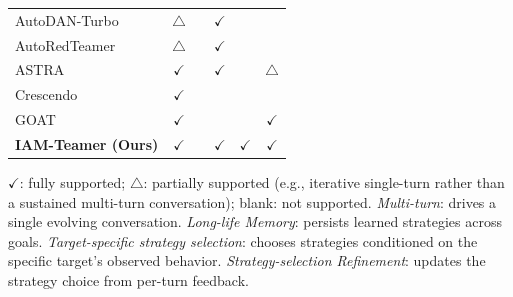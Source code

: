 \begin{table}[htbp]
\begin{tabular}{lccccc}
            AutoDAN-Turbo~\cite{autodanturbo}                                & $\triangle$        &                                      & $\checkmark$              &                                              &                                          \\
            AutoRedTeamer~\cite{autoredteamer}            & $\triangle$        &                                      & $\checkmark$              &                                              &                                          \\
            ASTRA~\cite{astra}                                               & $\checkmark$       &                                      & $\checkmark$              &                                              & $\triangle$                              \\
            Crescendo~\cite{crescendo}                    & $\checkmark$       &                                      &                           &                                              &                                          \\
            GOAT~\cite{goat}                                                 & $\checkmark$       &                                      &                           &                                              & $\checkmark$                             \\
            \midrule
            \textbf{IAM-Teamer (Ours)}                    & $\checkmark$       &                                      & $\checkmark$              & $\checkmark$                                 & $\checkmark$                             \\
            \bottomrule
      \end{tabular}

      \begin{minipage}{\linewidth}
            \footnotesize $\checkmark$: fully supported; $\triangle$: partially supported (e.g., iterative single-turn rather than a sustained multi-turn conversation); blank: not supported. \emph{Multi-turn}: drives a single evolving conversation. \emph{Long-life Memory}: persists learned strategies across goals. \emph{Target-specific strategy selection}: chooses strategies conditioned on the specific target's observed behavior. \emph{Strategy-selection Refinement}: updates the strategy choice from per-turn feedback.
      \end{minipage}
\end{table}

